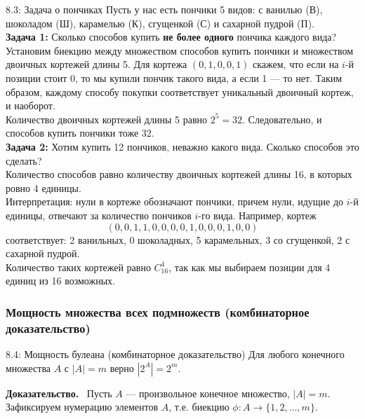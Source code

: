 \documentclass[a4paper,12pt]{article}
\newcommand{\myproof}{\textbf{Доказательство.}\ }
\begin{document}
	\begin{examplebox}{8.3: Задача о пончиках}
		Пусть у нас есть пончики 5 видов: с ванилью (В), шоколадом (Ш), карамелью (К), сгущенкой (С) и сахарной пудрой (П).\\
		
		\textbf{Задача 1:} Сколько способов купить \textbf{не более одного} пончика каждого вида?\\
		
		Установим биекцию между множеством способов купить пончики и множеством двоичных кортежей длины 5. Для кортежа $(0, 1, 0, 0, 1)$ скажем, что если на $i$-й позиции стоит 0, то мы купили пончик такого вида, а если 1 — то нет. Таким образом, каждому способу покупки соответствует уникальный двоичный кортеж, и наоборот.\\
		
		Количество двоичных кортежей длины 5 равно $2^5 = 32$. Следовательно, и способов купить пончики тоже 32.\\
		
		\textbf{Задача 2:} Хотим купить 12 пончиков, неважно какого вида. Сколько способов это сделать?\\
		
		Количество способов равно количеству двоичных кортежей длины 16, в которых ровно 4 единицы. \\
		
		Интерпретация: нули в кортеже обозначают пончики, причем нули, идущие до $i$-й единицы, отвечают за количество пончиков $i$-го вида. Например, кортеж
		\[ (0, 0, 1, 1, 0, 0, 0, 0, 1, 0, 0, 0, 1, 0, 0) \]
		соответствует: 2 ванильных, 0 шоколадных, 5 карамельных, 3 со сгущенкой, 2 с сахарной пудрой.\\
		
		Количество таких кортежей равно $C_{16}^4$, так как мы выбираем позиции для 4 единиц из 16 возможных.
	\end{examplebox}
	
	\subsubsection{Мощность множества всех подмножеств (комбинаторное доказательство)}
	
	\begin{theorembox}{8.4: Мощность булеана (комбинаторное доказательство)}
		Для любого конечного множества $A$ с $|A| = m$ верно $|2^A| = 2^m$.
	\end{theorembox}
	
	\myproof
	Пусть $A$ — произвольное конечное множество, $|A| = m$. Зафиксируем нумерацию элементов $A$, т.е. биекцию $\phi: A \to \{1, 2, \dots, m\}$.
	
\end{document}
